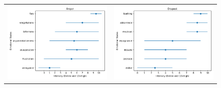 \begin{figure}[!h]
\hspace*{-1.25cm}
    \begin{tabular}{cc}
    
        \includegraphics[scale=0.5]{Images/AtlasEmotionalStatesGraphics/Figure_anger.png} & \includegraphics[scale=0.5]{Images/AtlasEmotionalStatesGraphics/Figure_Disgust.png} \\

\end{tabular}
\end{figure}
